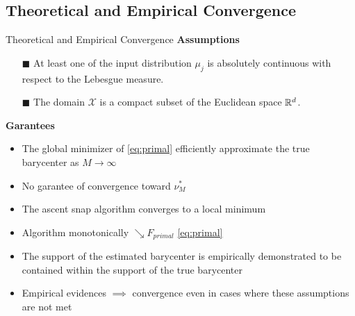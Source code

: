 \subsection{Theoretical and Empirical Convergence}
\begin{frame}{Theoretical and Empirical Convergence}
    \textbf{Assumptions}
    \begin{itemize}
        \item[$\blacksquare$]  At least one of the input distribution $\mu_j$ is absolutely continuous with respect to the Lebesgue measure.
    \item[$\blacksquare$] The domain $\mathcal{X}$ is a compact subset of the Euclidean space $\mathbb{R}^d$.
    \end{itemize}
    \textbf{Garantees}
    \begin{itemize}
        \item The global minimizer of \eqref{eq:primal} efficiently approximate the true barycenter as $M\rightarrow \infty$
        \item No garantee of convergence toward $\nu_M^*$
        \item The ascent snap algorithm converges to a local minimum
        \item Algorithm monotonically $\searrow F_{primal}$ \eqref{eq:primal}
        \item The support of the estimated barycenter is empirically demonstrated to be contained within the support of the true barycenter
        \item Empirical evidences $\implies$ convergence even in cases where these assumptions are not met
    \end{itemize}
\end{frame}